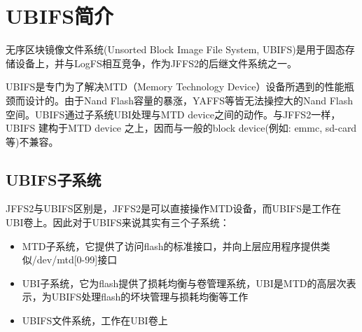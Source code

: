 \chapter{UBIFS简介}
无序区块镜像文件系统(Unsorted Block Image File System, UBIFS)是用于固态存储设备上，并与LogFS相互竞争，作为JFFS2的后继文件系统之一。

UBIFS是专门为了解决MTD（Memory Technology Device）设备所遇到的性能瓶颈而设计的。由于Nand Flash容量的暴涨，YAFFS等皆无法操控大的Nand Flash空间。UBIFS通过子系统UBI处理与MTD device之间的动作。与JFFS2一样，UBIFS 建构于MTD device 之上，因而与一般的block device(例如: emmc, sd-card等)不兼容。

\section{UBIFS子系统}
JFFS2与UBIFS区别是，JFFS2是可以直接操作MTD设备，而UBIFS是工作在UBI卷上。因此对于UBIFS来说其实有三个子系统：
\begin{itemize}
  \item MTD子系统，它提供了访问flash的标准接口，并向上层应用程序提供类似/dev/mtd[0-99]接口
  \item UBI子系统，它为flash提供了损耗均衡与卷管理系统，UBI是MTD的高层次表示，为UBIFS处理flash的坏块管理与损耗均衡等工作
  \item UBIFS文件系统，工作在UBI卷上
\end{itemize}


